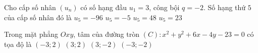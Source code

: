 \begin{ex}%
Cho cấp số nhân $(u_n)$ có số hạng đầu $u_1=3$, công bội $q=-2$. Số hạng thứ $5$ của cấp số nhân đó là
	\choice
	{$u_5=-96$}
	{$u_5=-5$}
	{\True $u_5=48$}
	{$u_5=23$}
\end{ex}

\begin{ex}%
Trong mặt phẳng $Oxy$, tâm của đường tròn $(C)\colon x^2+y^2+6x-4y-23=0$ có tọa độ là
	\choice
	{\True $(-3;2)$}
	{$(3;2)$}
	{$(3;-2)$}
	{$(-3;-2)$}
\end{ex}


